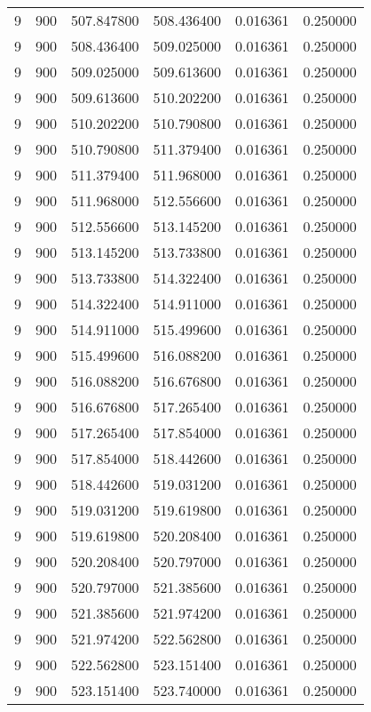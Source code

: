 \begin{longtable}{rrrrrr}
9 & 900 & 507.847800 & 508.436400 & 0.016361 & 0.250000 \\
9 & 900 & 508.436400 & 509.025000 & 0.016361 & 0.250000 \\
9 & 900 & 509.025000 & 509.613600 & 0.016361 & 0.250000 \\
9 & 900 & 509.613600 & 510.202200 & 0.016361 & 0.250000 \\
9 & 900 & 510.202200 & 510.790800 & 0.016361 & 0.250000 \\
9 & 900 & 510.790800 & 511.379400 & 0.016361 & 0.250000 \\
9 & 900 & 511.379400 & 511.968000 & 0.016361 & 0.250000 \\
9 & 900 & 511.968000 & 512.556600 & 0.016361 & 0.250000 \\
9 & 900 & 512.556600 & 513.145200 & 0.016361 & 0.250000 \\
9 & 900 & 513.145200 & 513.733800 & 0.016361 & 0.250000 \\
9 & 900 & 513.733800 & 514.322400 & 0.016361 & 0.250000 \\
9 & 900 & 514.322400 & 514.911000 & 0.016361 & 0.250000 \\
9 & 900 & 514.911000 & 515.499600 & 0.016361 & 0.250000 \\
9 & 900 & 515.499600 & 516.088200 & 0.016361 & 0.250000 \\
9 & 900 & 516.088200 & 516.676800 & 0.016361 & 0.250000 \\
9 & 900 & 516.676800 & 517.265400 & 0.016361 & 0.250000 \\
9 & 900 & 517.265400 & 517.854000 & 0.016361 & 0.250000 \\
9 & 900 & 517.854000 & 518.442600 & 0.016361 & 0.250000 \\
9 & 900 & 518.442600 & 519.031200 & 0.016361 & 0.250000 \\
9 & 900 & 519.031200 & 519.619800 & 0.016361 & 0.250000 \\
9 & 900 & 519.619800 & 520.208400 & 0.016361 & 0.250000 \\
9 & 900 & 520.208400 & 520.797000 & 0.016361 & 0.250000 \\
9 & 900 & 520.797000 & 521.385600 & 0.016361 & 0.250000 \\
9 & 900 & 521.385600 & 521.974200 & 0.016361 & 0.250000 \\
9 & 900 & 521.974200 & 522.562800 & 0.016361 & 0.250000 \\
9 & 900 & 522.562800 & 523.151400 & 0.016361 & 0.250000 \\
9 & 900 & 523.151400 & 523.740000 & 0.016361 & 0.250000 \\

\end{longtable}
